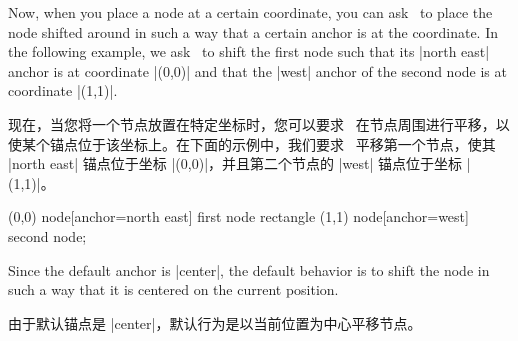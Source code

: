 Now, when you place a node at a certain coordinate, you can ask \tikzname\ to
place the node shifted around in such a way that a certain anchor is at the
coordinate. In the following example, we ask \tikzname\ to shift the first node
such that its  |north east| anchor is at coordinate |(0,0)| and that the |west|
anchor of the second node is at coordinate |(1,1)|.

现在，当您将一个节点放置在特定坐标时，您可以要求 \tikzname\ 在节点周围进行平移，以使某个锚点位于该坐标上。在下面的示例中，我们要求 \tikzname\ 平移第一个节点，使其 |north east| 锚点位于坐标 |(0,0)|，并且第二个节点的 |west| 锚点位于坐标 |(1,1)|。

\begin{codeexample}[]
\tikz \draw           (0,0) node[anchor=north east] {first node}
            rectangle (1,1) node[anchor=west] {second node};
\end{codeexample}

Since the default anchor is |center|, the default behavior is to shift the node
in such a way that it is centered on the current position.

由于默认锚点是 |center|，默认行为是以当前位置为中心平移节点。

